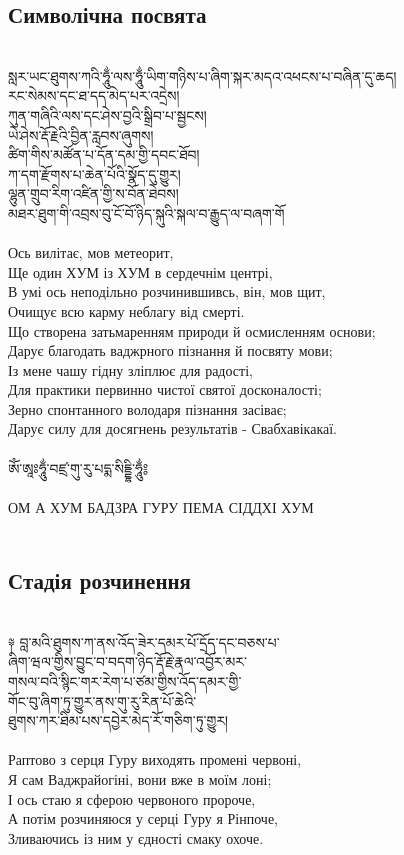 \newpage
\subsection{Символічна посвята}
\\
\ti
སླར་ཡང་ཐུགས་ཀའི་ཧཱུྂ་ལས་ཧཱུྂ་ཡིག་གཉིས་པ་ཞིག་སྐར་མདའ་འཕངས་པ་བཞིན་དུ་ཆད།\\
རང་སེམས་དང་ཐ་དད་མེད་པར་འདྲེས།\\
ཀུན་གཞིའི་ལས་དང་ཤེས་བྱའི་སྒྲིབ་པ་སྦྱངས།\\
ཡེ་ཤེས་རྡོ་རྗེའི་བྱིན་རླབས་ཞུགས།\\
ཚིག་གིས་མཚོན་པ་དོན་དམ་གྱི་དབང་ཐོབ།\\
ཀ་དག་རྫོགས་པ་ཆེན་པོའི་སྣོད་དུ་གྱུར།\\
ལྷུན་གྲུབ་རིག་འཛིན་གྱི་ས་བོན་ཐེབས།\\
མཐར་ཐུག་གི་འབྲས་བུ་ངོ་བོ་ཉིད་སྐུའི་སྐལ་བ་རྒྱུད་ལ་བཞག་གོ\\
\\
\ru
Ось вилітає, мов метеорит, \\
Ще один ХУМ із ХУМ в сердечнім центрі,\\
В умі ось неподільно розчинившивсь, він, мов щит,\\
Очищує всю карму неблагу від смерті. \\
Що створена затьмаренням природи й осмисленням основи; \\
Дарує благодать ваджрного пізнання й посвяту мови;\\
Із мене чашу гідну зліплює для радості,\\
Для практики первинно чистої святої досконалості;\\
Зерно спонтанного володаря пізнання засіває;\\
Дарує силу для досягнень результатів - Свабхавікакаї.\\
\\
\ti ཨོཾ་ཨཱཿཧཱུྂ་བཛྲ་གུ་རུ་པདྨ་སིདྡྷི་ཧཱུྂ༔\\
\\
\ru ОМ А ХУМ БАДЗРА ГУРУ ПЕМА СІДДХІ ХУМ\\
\\
\newpage
\subsection{Стадія розчинення}
\\
\ti
༈ བླ་མའི་ཐུགས་ཀ་ནས་འོད་ཟེར་དམར་པོ་དྲོད་དང་བཅས་པ་\\
ཞིག་ཝལ་གྱིས་བྱུང་བ་བདག་ཉིད་རྡོ་རྗེ་རྣལ་འབྱོར་མར་\\
གསལ་བའི་སྙིང་གར་རེག་པ་ཙམ་གྱིས་འོད་དམར་གྱི་\\
གོང་བུ་ཞིག་ཏུ་གྱུར་ནས་གུ་རུ་རིན་པོ་ཆེའི་\\
ཐུགས་ཀར་ཐིམ་པས་དབྱེར་མེད་རོ་གཅིག་ཏུ་གྱུར།\\
\\
\ru
Раптово з серця Гуру виходять промені червоні, \\
Я сам Ваджрайогіні, вони вже в моїм лоні;\\
І ось стаю я сферою червоного пророче,\\
А потім розчиняюся у серці Гуру я Рінпоче,\\
Зливаючись із ним у єдності смаку охоче.\\
